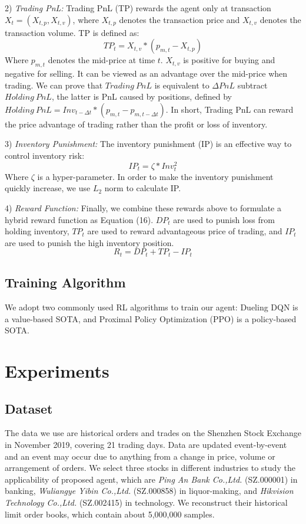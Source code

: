 \documentclass[conference]{IEEEtran}
\begin{document}
2) \textit{Trading PnL:} Trading PnL (TP) rewards the agent only at transaction $X_t = (X_{t,p}, X_{t,v})$, where $X_{t,p}$ denotes the transaction price and $X_{t,v}$ denotes the transaction volume. TP is defined as:
\begin{equation}
TP_t = X_{t,v} * (p_{m,t} - X_{t,p}) \tag{14}
\end{equation}
Where $p_{m,t}$ denotes the mid-price at time $t$. $X_{t,v}$ is positive for buying and negative for selling. It can be viewed as an advantage over the mid-price when trading. We can prove that $Trading\ PnL$ is equivalent to $\Delta PnL$ subtract $Holding\ PnL$, the latter is PnL caused by positions, defined by $Holding\ PnL = Inv_{t-\Delta t} * (p_{m,t} - p_{m,t-\Delta t})$. In short, Trading PnL can reward the price advantage of trading rather than the profit or loss of inventory.


3) \textit{Inventory Punishment:} The inventory punishment (IP) is an effective way to control inventory risk:
\begin{equation}
IP_t = \zeta * Inv_t^2 \tag{15}
\end{equation}
Where $\zeta$ is a hyper-parameter. In order to make the inventory punishment quickly increase, we use $L_2$ norm to calculate IP.

4) \textit{Reward Function:} Finally, we combine these rewards above to formulate a hybrid reward function as Equation (16). $DP_t$ are used to punish loss from holding inventory, $TP_t$ are used to reward advantageous price of trading, and $IP_t$ are used to punish the high inventory position.
\begin{equation}
R_t = DP_t + TP_t - IP_t \tag{16}
\end{equation}

\subsection{Training Algorithm}
We adopt two commonly used RL algorithms to train our agent: Dueling DQN is a value-based SOTA, and Proximal Policy Optimization (PPO) is a policy-based SOTA.

\section{Experiments}
\subsection{Dataset}
The data we use are historical orders and trades on the Shenzhen Stock Exchange in November 2019, covering 21 trading days. Data are updated event-by-event and an event may occur due to anything from a change in price, volume or arrangement of orders. We select three stocks in different industries to study the applicability of proposed agent, which are \textit{Ping An Bank Co.,Ltd.} (SZ.000001) in banking, \textit{Wuliangye Yibin Co.,Ltd.} (SZ.000858) in liquor-making, and \textit{Hikvision Technology Co.,Ltd.} (SZ.002415) in technology. We reconstruct their historical limit order books, which contain about 5,000,000 samples.
\end{document}
